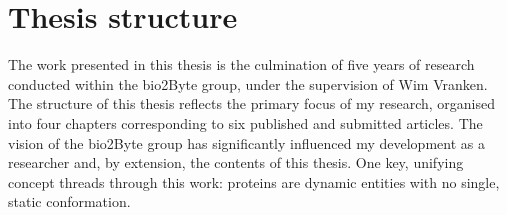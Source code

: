 \chapter*{Thesis structure}


The work presented in this thesis is the culmination of five years of research conducted within the bio2Byte group, under the supervision of Wim Vranken. The structure of this thesis reflects the primary focus of my research, organised into four chapters corresponding to six published and submitted articles. The vision of the bio2Byte group has significantly influenced my development as a researcher and, by extension, the contents of this thesis. One key, unifying concept threads through this work: proteins are dynamic entities with no single, static conformation.
 \vspace{0.8 em}

